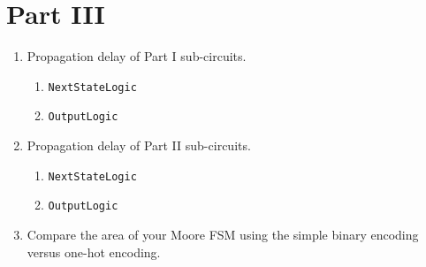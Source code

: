 \documentclass[parskip=half]{scrarticle}
\begin{document}
\section*{Part III}

\begin{enumerate}
\item Propagation delay of Part I sub-circuits.
\begin{enumerate}
    \item \texttt{NextStateLogic}

    \item \texttt{OutputLogic}
\end{enumerate}

\item Propagation delay of Part II sub-circuits.
\begin{enumerate}
    \item \texttt{NextStateLogic}

    \item \texttt{OutputLogic}
\end{enumerate}

\item Compare the area of your Moore FSM using the simple binary encoding versus one-hot encoding.
\end{enumerate}
\end{document}

